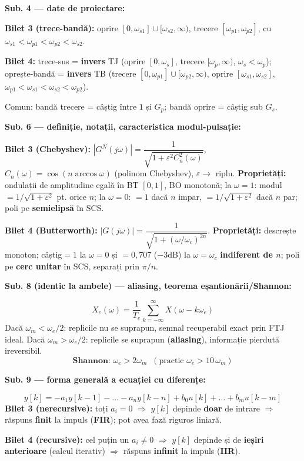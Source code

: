 \documentclass[10pt,a4paper]{article}
\begin{document}
\textbf{Sub. 4 — date de proiectare:}
\begin{keyeq}\color{red!65!black}
\textbf{Bilet 3 (trece-bandă):} oprire $[0,\omega_{s1}]\cup[\omega_{s2},\infty)$, trecere $[\omega_{p1},\omega_{p2}]$, cu $\omega_{s1}<\omega_{p1}<\omega_{p2}<\omega_{s2}$.

\textbf{Bilet 4:} trece-sus = \textbf{invers} TJ (oprire $[0,\omega_s]$, trecere $[\omega_p,\infty)$, $\omega_s<\omega_p$); oprește-bandă = \textbf{invers} TB (trecere $[0,\omega_{p1}]\cup[\omega_{p2},\infty)$, oprire $[\omega_{s1},\omega_{s2}]$, $\omega_{p1}<\omega_{s1}<\omega_{s2}<\omega_{p2}$).

Comun: bandă trecere = câștig între $1$ și $G_p$; bandă oprire = câștig sub $G_s$.
\end{keyeq}

\textbf{Sub. 6 — definiție, notații, caracteristica modul-pulsație:}
\begin{keyeq}\color{red!65!black}
\textbf{Bilet 3 (Chebyshev):} $|G^N(j\omega)|=\dfrac{1}{\sqrt{1+\varepsilon^2C_n^2(\omega)}}$, $C_n(\omega)=\cos(n\arccos\omega)$ (polinom Chebyshev), $\varepsilon\to$ riplu. \textbf{Proprietăți:} ondulații de amplitudine egală în BT $[0,1]$, BO monotonă; la $\omega=1$: modul$=1/\sqrt{1+\varepsilon^2}$ pt. orice $n$; la $\omega=0$: $=1$ dacă $n$ impar, $=1/\sqrt{1+\varepsilon^2}$ dacă $n$ par; poli pe \textbf{semielipsă} în SCS.

\textbf{Bilet 4 (Butterworth):} $|G(j\omega)|=\dfrac{1}{\sqrt{1+(\omega/\omega_c)^{2n}}}$. \textbf{Proprietăți:} descrește monoton; câștig$=1$ la $\omega=0$ și $=0{,}707$ ($-3$dB) la $\omega=\omega_c$ \textbf{indiferent de $n$}; poli pe \textbf{cerc unitar} în SCS, separați prin $\pi/n$.
\end{keyeq}

\textbf{Sub. 8 (identic la ambele) — aliasing, teorema eșantionării/Shannon:}
\begin{keyeq}\color{red!65!black}
$$X_e(\omega)=\frac{1}{T_e}\sum_{k=-\infty}^{\infty}X(\omega-k\omega_e)$$
Dacă $\omega_m<\omega_e/2$: replicile nu se suprapun, semnal recuperabil exact prin FTJ ideal. Dacă $\omega_m>\omega_e/2$: replicile se suprapun (\textbf{aliasing}), informație pierdută ireversibil.
$$\textbf{Shannon: } \omega_e>2\omega_m \;\;(\text{practic } \omega_e>10\,\omega_m)$$
\end{keyeq}

\textbf{Sub. 9 — forma generală a ecuației cu diferențe:}
\begin{keyeq}\color{red!65!black}
$$y[k]=-a_1y[k-1]-\dots-a_ny[k-n]+b_0u[k]+\dots+b_mu[k-m]$$
\textbf{Bilet 3 (nerecursive):} toți $a_i=0$ $\Rightarrow$ $y[k]$ depinde \textbf{doar} de intrare $\Rightarrow$ răspuns \textbf{finit} la impuls (\textbf{FIR}); pot avea fază riguros liniară.

\textbf{Bilet 4 (recursive):} cel puțin un $a_i\ne0$ $\Rightarrow$ $y[k]$ depinde și de \textbf{ieșiri anterioare} (calcul iterativ) $\Rightarrow$ răspuns \textbf{infinit} la impuls (\textbf{IIR}).
\end{keyeq}
\end{document}
